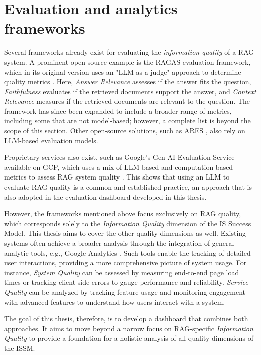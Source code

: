\documentclass[
	english,
	ruledheaders=section,%
	class=report,%
	thesis={type=bachelor},%
	accentcolor=1b,%
	custommargins=true,%
	marginpar=false,%
	parskip=half-,%
	fontsize=11pt,%
	DIV=14,
]{tudapub}
\begin{document}
\section{Evaluation and analytics frameworks}
Several frameworks already exist for evaluating the \textit{information quality} of a RAG system. A prominent open-source example is the RAGAS evaluation framework, which in its original version uses an "LLM as a judge" approach to determine quality metrics \parencite{Es_James_Espinosa_Anke_Schockaert_2024}. Here, \textit{Answer Relevance} assesses if the answer fits the question, \textit{Faithfulness} evaluates if the retrieved documents support the answer, and \textit{Context Relevance} measures if the retrieved documents are relevant to the question. The framework has since been expanded to include a broader range of metrics, including some that are not model-based; however, a complete list is beyond the scope of this section. Other open-source solutions, such as ARES \parencite{Saad_Falcon_Khattab_Potts_Zaharia_2024}, also rely on LLM-based evaluation models.

Proprietary services also exist, such as Google's Gen AI Evaluation Service available on GCP, which uses a mix of LLM-based and computation-based metrics to assess RAG system quality \parencite{GoogleGenAIEvaluation}. This shows that using an LLM to evaluate RAG quality is a common and established practice, an approach that is also adopted in the evaluation dashboard developed in this thesis.

However, the frameworks mentioned above focus exclusively on RAG quality, which corresponds solely to the \textit{Information Quality} dimension of the IS Success Model. This thesis aims to cover the other quality dimensions as well. Existing systems often achieve a broader analysis through the integration of general analytic tools, e.g., Google Analytics \parencite{GoogleAnalytics}. Such tools enable the tracking of detailed user interactions, providing a more comprehensive picture of system usage. For instance, \textit{System Quality} can be assessed by measuring end-to-end page load times or tracking client-side errors to gauge performance and reliability. \textit{Service Quality} can be analyzed by tracking feature usage and monitoring engagement with advanced features to understand how users interact with a system.

The goal of this thesis, therefore, is to develop a dashboard that combines both approaches. It aims to move beyond a narrow focus on RAG-specific \textit{Information Quality} to provide a foundation for a holistic analysis of all quality dimensions of the ISSM.
\end{document}
